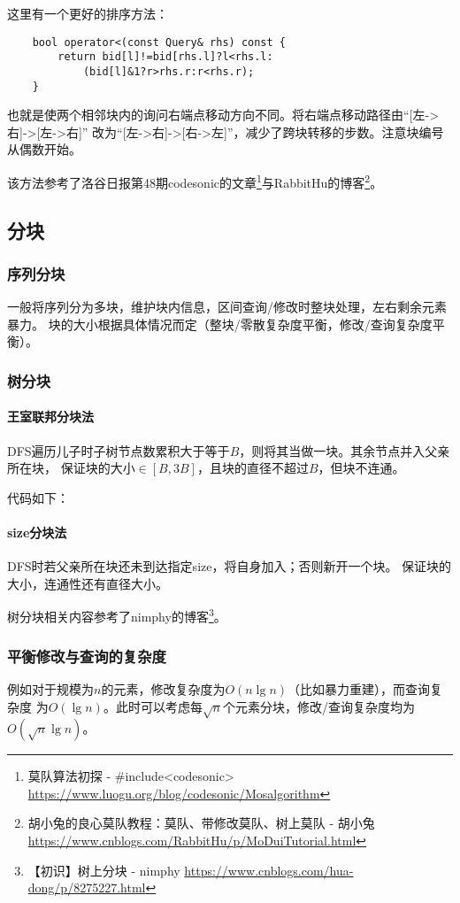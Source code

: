 这里有一个更好的排序方法：
\begin{lstlisting}
    bool operator<(const Query& rhs) const {
        return bid[l]!=bid[rhs.l]?l<rhs.l:
            (bid[l]&1?r>rhs.r:r<rhs.r);
    }
\end{lstlisting}

也就是使两个相邻块内的询问右端点移动方向不同。将右端点移动路径由``[左->右]->[左->右]''
改为``[左->右]->[右->左]''，减少了跨块转移的步数。注意块编号从偶数开始。

该方法参考了洛谷日报第48期codesonic的文章\footnote{
	莫队算法初探 - \#include<codesonic>\\
	\url{https://www.luogu.org/blog/codesonic/Mosalgorithm}
}与RabbitHu的博客\footnote{
	胡小兔的良心莫队教程：莫队、带修改莫队、树上莫队 - 胡小兔
	\url{https://www.cnblogs.com/RabbitHu/p/MoDuiTutorial.html}
}。
\subsection{分块}\label{dividing}
\subsubsection{序列分块}
一般将序列分为多块，维护块内信息，区间查询/修改时整块处理，左右剩余元素暴力。
块的大小根据具体情况而定（整块/零散复杂度平衡，修改/查询复杂度平衡）。
\subsubsection{树分块}
\paragraph{王室联邦分块法}
DFS遍历儿子时子树节点数累积大于等于$B$，则将其当做一块。其余节点并入父亲所在块，
保证块的大小$\in [B,3B]$，且块的直径不超过$B$，但块不连通。

代码如下：

\paragraph{size分块法}
DFS时若父亲所在块还未到达指定size，将自身加入；否则新开一个块。
保证块的大小，连通性还有直径大小。

树分块相关内容参考了nimphy的博客\footnote{
	【初识】树上分块 - nimphy
	\url{https://www.cnblogs.com/hua-dong/p/8275227.html}
}。
\subsubsection{平衡修改与查询的复杂度}
例如对于规模为$n$的元素，修改复杂度为$O(n\lg n)$（比如暴力重建），而查询复杂度
为$O(\lg n)$。此时可以考虑每$\sqrt{n}$个元素分块，修改/查询复杂度均为
$O(\sqrt{n}\lg n)$。
